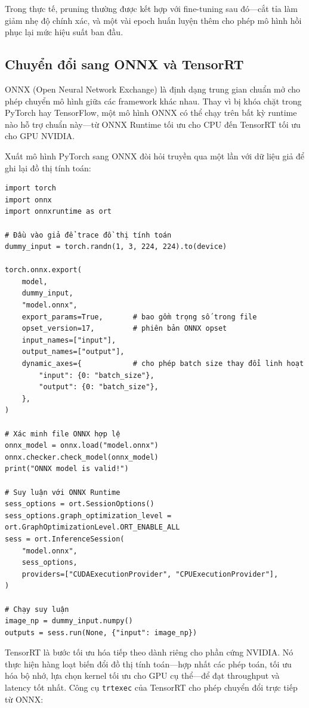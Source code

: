 Trong thực tế, pruning thường được kết hợp với fine-tuning sau đó---cắt tỉa làm giảm nhẹ độ chính xác, và một vài epoch huấn luyện thêm cho phép mô hình hồi phục lại mức hiệu suất ban đầu.

\subsection{Chuyển đổi sang ONNX và TensorRT}
\label{subsec:onnx_tensorrt}

ONNX (Open Neural Network Exchange) là định dạng trung gian chuẩn mở cho phép chuyển mô hình giữa các framework khác nhau. Thay vì bị khóa chặt trong PyTorch hay TensorFlow, một mô hình ONNX có thể chạy trên bất kỳ runtime nào hỗ trợ chuẩn này---từ ONNX Runtime tối ưu cho CPU đến TensorRT tối ưu cho GPU NVIDIA.

Xuất mô hình PyTorch sang ONNX đòi hỏi truyền qua một lần với dữ liệu giả để ghi lại đồ thị tính toán:

\begin{verbatim}
import torch
import onnx
import onnxruntime as ort

# Đầu vào giả để trace đồ thị tính toán
dummy_input = torch.randn(1, 3, 224, 224).to(device)

torch.onnx.export(
    model,
    dummy_input,
    "model.onnx",
    export_params=True,       # bao gồm trọng số trong file
    opset_version=17,         # phiên bản ONNX opset
    input_names=["input"],
    output_names=["output"],
    dynamic_axes={            # cho phép batch size thay đổi linh hoạt
        "input": {0: "batch_size"},
        "output": {0: "batch_size"},
    },
)

# Xác minh file ONNX hợp lệ
onnx_model = onnx.load("model.onnx")
onnx.checker.check_model(onnx_model)
print("ONNX model is valid!")

# Suy luận với ONNX Runtime
sess_options = ort.SessionOptions()
sess_options.graph_optimization_level = ort.GraphOptimizationLevel.ORT_ENABLE_ALL
sess = ort.InferenceSession(
    "model.onnx",
    sess_options,
    providers=["CUDAExecutionProvider", "CPUExecutionProvider"],
)

# Chạy suy luận
image_np = dummy_input.numpy()
outputs = sess.run(None, {"input": image_np})
\end{verbatim}

TensorRT là bước tối ưu hóa tiếp theo dành riêng cho phần cứng NVIDIA. Nó thực hiện hàng loạt biến đổi đồ thị tính toán---hợp nhất các phép toán, tối ưu hóa bộ nhớ, lựa chọn kernel tối ưu cho GPU cụ thể---để đạt throughput và latency tốt nhất. Công cụ \texttt{trtexec} của TensorRT cho phép chuyển đổi trực tiếp từ ONNX:

